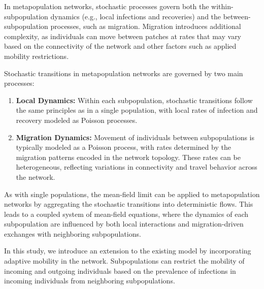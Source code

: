 In metapopulation networks, stochastic processes govern both the within-subpopulation dynamics (e.g., local infections and recoveries) and the between-subpopulation processes, such as migration. Migration introduces additional complexity, as individuals can move between patches at rates that may vary based on the connectivity of the network and other factors such as applied mobility restrictions.

Stochastic transitions in metapopulation networks are governed by two main processes:

\begin{enumerate}
    \item \textbf{Local Dynamics:} Within each subpopulation, stochastic transitions follow the same principles as in a single population, with local rates of infection and recovery modeled as Poisson processes.
    \item \textbf{Migration Dynamics:} Movement of individuals between subpopulations is typically modeled as a Poisson process, with rates determined by the migration patterns encoded in the network topology. These rates can be heterogeneous, reflecting variations in connectivity and travel behavior across the network.
\end{enumerate}

As with single populations, the mean-field limit can be applied to metapopulation networks by aggregating the stochastic transitions into deterministic flows. This leads to a coupled system of mean-field equations, where the dynamics of each subpopulation are influenced by both local interactions and migration-driven exchanges with neighboring subpopulations.

In this study, we introduce an extension to the existing model by incorporating adaptive mobility in the network. Subpopulations can restrict the mobility of incoming and outgoing individuals based on the prevalence of infections in incoming individuals from neighboring subpopulations.

% 